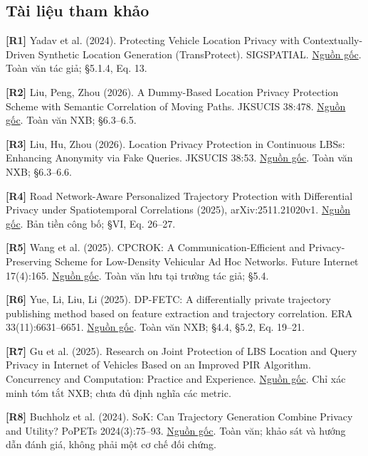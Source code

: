 \documentclass[10pt,a4paper]{article}
\begin{document}
\subsection{Tài liệu tham khảo}
\par\hypertarget{ref-R1}{}\textbf{[R1]} Yadav et al. (2024). Protecting Vehicle Location Privacy with Contextually-Driven Synthetic Location Generation (TransProtect). SIGSPATIAL. \href{https://arxiv.org/html/2409.09495v1}{Nguồn gốc}. Toàn văn tác giả; §5.1.4, Eq. 13.
\par\hypertarget{ref-R2}{}\textbf{[R2]} Liu, Peng, Zhou (2026). A Dummy-Based Location Privacy Protection Scheme with Semantic Correlation of Moving Paths. JKSUCIS 38:478. \href{https://link.springer.com/article/10.1007/s44443-026-00899-w}{Nguồn gốc}. Toàn văn NXB; §6.3–6.5.
\par\hypertarget{ref-R3}{}\textbf{[R3]} Liu, Hu, Zhou (2026). Location Privacy Protection in Continuous LBSs: Enhancing Anonymity via Fake Queries. JKSUCIS 38:53. \href{https://link.springer.com/article/10.1007/s44443-025-00438-z}{Nguồn gốc}. Toàn văn NXB; §6.3–6.6.
\par\hypertarget{ref-R4}{}\textbf{[R4]} Road Network-Aware Personalized Trajectory Protection with Differential Privacy under Spatiotemporal Correlations (2025), arXiv:2511.21020v1. \href{https://arxiv.org/html/2511.21020v1}{Nguồn gốc}. Bản tiền công bố; §VI, Eq. 26–27.
\par\hypertarget{ref-R5}{}\textbf{[R5]} Wang et al. (2025). CPCROK: A Communication-Efficient and Privacy-Preserving Scheme for Low-Density Vehicular Ad Hoc Networks. Future Internet 17(4):165. \href{https://uhra.herts.ac.uk/id/eprint/25705/1/futureinternet-17-00165.pdf}{Nguồn gốc}. Toàn văn lưu tại trường tác giả; §5.4.
\par\hypertarget{ref-R6}{}\textbf{[R6]} Yue, Li, Liu, Li (2025). DP-FETC: A differentially private trajectory publishing method based on feature extraction and trajectory correlation. ERA 33(11):6631–6651. \href{https://www.aimspress.com/aimspress-data/era/2025/11/PDF/era-33-11-293.pdf}{Nguồn gốc}. Toàn văn NXB; §4.4, §5.2, Eq. 19–21.
\par\hypertarget{ref-R7}{}\textbf{[R7]} Gu et al. (2025). Research on Joint Protection of LBS Location and Query Privacy in Internet of Vehicles Based on an Improved PIR Algorithm. Concurrency and Computation: Practice and Experience. \href{https://onlinelibrary.wiley.com/doi/abs/10.1002/cpe.70447}{Nguồn gốc}. Chỉ xác minh tóm tắt NXB; chưa đủ định nghĩa các metric.
\par\hypertarget{ref-R8}{}\textbf{[R8]} Buchholz et al. (2024). SoK: Can Trajectory Generation Combine Privacy and Utility? PoPETs 2024(3):75–93. \href{https://petsymposium.org/popets/2024/popets-2024-0068.pdf}{Nguồn gốc}. Toàn văn; khảo sát và hướng dẫn đánh giá, không phải một cơ chế đối chứng.
\end{document}
